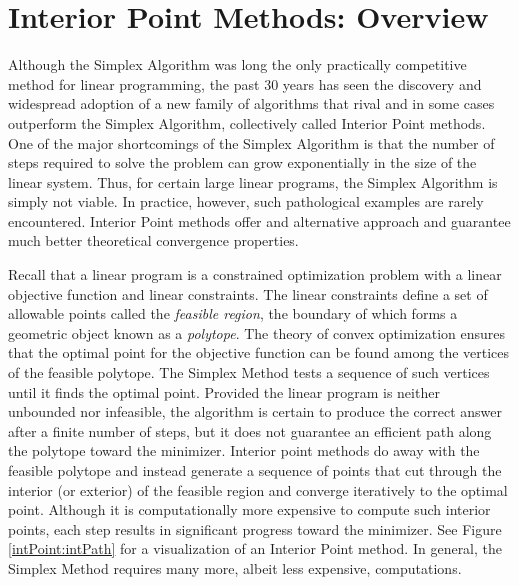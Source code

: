 
\section*{Interior Point Methods: Overview}
Although the Simplex Algorithm was long the only practically competitive method for linear programming, the past 30 years has seen the discovery and widespread adoption of a new family of algorithms that rival and in some cases outperform the Simplex Algorithm, collectively called Interior Point methods. One of the major shortcomings of the Simplex Algorithm is that the number of steps required to solve the problem can grow exponentially in the size of the linear system. Thus, for certain large linear programs, the Simplex Algorithm is simply not viable. In practice, however, such pathological examples are rarely encountered. Interior Point methods offer and alternative approach and guarantee much better theoretical convergence properties.

Recall that a linear program is a constrained optimization problem with a linear objective function and linear constraints.
The linear constraints define a set of allowable points called the \emph{feasible region}, the boundary of which forms a geometric
object known as a \emph{polytope}. The theory of convex optimization ensures that the optimal point for the objective function
can be found among the vertices of the feasible polytope. The Simplex Method tests a sequence of such vertices until it finds
the optimal point. Provided the linear program is neither unbounded nor infeasible, the algorithm is certain to produce the correct
answer after a finite number of steps, but it does not guarantee an efficient path along the polytope toward the minimizer. Interior point methods do away with the feasible polytope and instead generate a sequence of points that cut through the interior (or
exterior) of the feasible region and converge iteratively to the optimal point. Although it is computationally more expensive to
compute such interior points, each step results in significant progress toward the minimizer. See Figure \ref{intPoint:intPath} for
a visualization of an Interior Point method. In general, the Simplex Method requires many more, albeit less expensive, computations.

